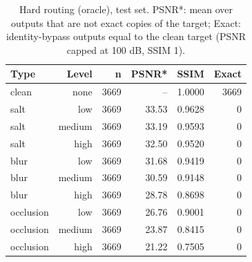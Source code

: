 \begin{table}[t]
\centering
\caption{Hard routing (oracle), test set. PSNR*: mean over outputs that are not exact copies of the target; Exact: identity-bypass outputs equal to the clean target (PSNR capped at 100 dB, SSIM 1).}
\label{tab:t2_routing_oracle_by_type_level}
\begin{tabular}{lrrrrr}
\toprule
Type & Level & n & PSNR* & SSIM & Exact \\
\midrule
clean & none & 3669 & -- & 1.0000 & 3669 \\
salt & low & 3669 & 33.53 & 0.9628 & 0 \\
salt & medium & 3669 & 33.19 & 0.9593 & 0 \\
salt & high & 3669 & 32.50 & 0.9520 & 0 \\
blur & low & 3669 & 31.68 & 0.9419 & 0 \\
blur & medium & 3669 & 30.59 & 0.9148 & 0 \\
blur & high & 3669 & 28.78 & 0.8698 & 0 \\
occlusion & low & 3669 & 26.76 & 0.9001 & 0 \\
occlusion & medium & 3669 & 23.87 & 0.8415 & 0 \\
occlusion & high & 3669 & 21.22 & 0.7505 & 0 \\
\bottomrule
\end{tabular}
\end{table}
